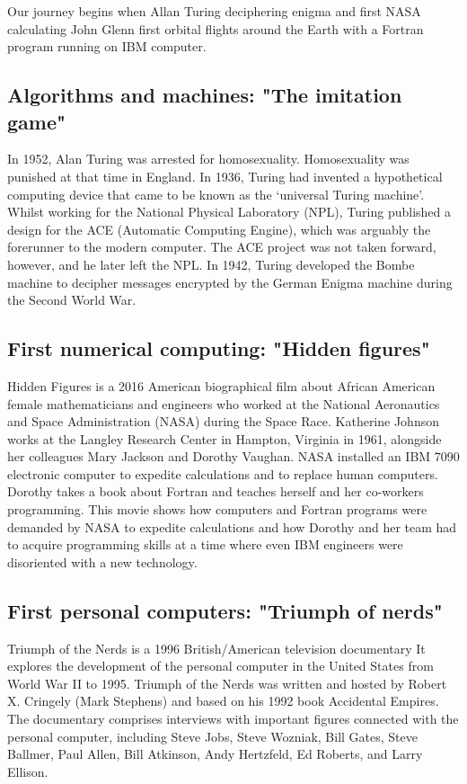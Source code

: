 Our journey begins when Allan Turing deciphering enigma and first NASA calculating 
John Glenn first orbital flights around the Earth with a Fortran program running on IBM computer. 
  
  
  \newpage 
\subsection*{Algorithms and machines: "The imitation game"} 
 In 1952, Alan Turing was arrested for homosexuality. 
 Homosexuality was punished at that time in England. 
 In 1936, Turing had invented a hypothetical computing device that came to be known 
 as the ‘universal Turing machine’. 
 Whilst working for the National Physical Laboratory (NPL), 
 Turing published a design for the ACE (Automatic Computing Engine), which was 
 arguably the forerunner to the modern computer. 
 The ACE project was not taken forward, however, and he later left the NPL. 
 In 1942,  Turing developed the Bombe machine to decipher messages encrypted by the German Enigma 
 machine during the Second World War. 
 
   
   
\subsection*{First numerical computing: "Hidden figures"}
 Hidden Figures is a 2016 American biographical  film 
 about African American female mathematicians and engineers 
 who worked at the National Aeronautics and Space Administration (NASA) 
 during the Space Race.
 Katherine Johnson works at the Langley Research Center in Hampton, Virginia in 1961, 
 alongside her colleagues Mary Jackson and Dorothy Vaughan. 
 NASA installed an IBM 7090 electronic computer to expedite calculations and to replace human computers. 
 Dorothy takes a book about Fortran and teaches herself and her co-workers programming. 
 This movie shows how computers and Fortran programs were demanded by NASA
 to expedite calculations and how Dorothy and her team had to acquire programming skills 
 at a time where even IBM engineers were disoriented with a new technology. 
 
  
   
  
\subsection*{First personal computers: "Triumph of nerds"}
 Triumph of the Nerds is a 1996 British/American television documentary
 It explores the development of the personal computer in the United States from World War II to 1995. 
 Triumph of the Nerds was written and hosted by Robert X. Cringely (Mark Stephens) 
 and based on his 1992 book Accidental Empires. 
 The documentary comprises interviews with important figures connected with the personal computer, 
 including Steve Jobs, Steve Wozniak, Bill Gates, Steve Ballmer, Paul Allen, Bill Atkinson, 
 Andy Hertzfeld, Ed Roberts, and Larry Ellison. 
 
